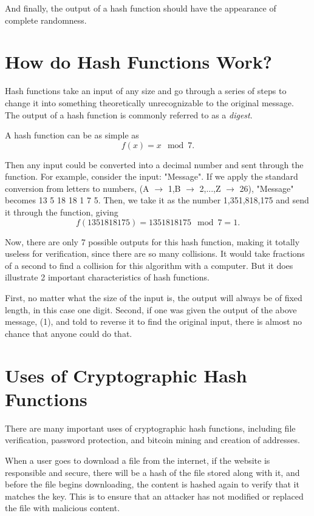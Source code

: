 \documentclass{article}
\begin{document}
And finally, the output of a hash function should have the appearance of complete randomness.

\section{How do Hash Functions Work?}
Hash functions take an input of any size and go through a series of steps to change it into something theoretically unrecognizable to the original message.
The output of a hash function is commonly referred to as a \textit{digest}.

A hash function can be as simple as $$f(x) = x\mod7.$$
		
Then any input could be converted into a decimal number and sent through the function. For example, consider the input: "Message". If we apply the standard conversion from letters to numbers, (A $\rightarrow$ 1,B $\rightarrow$ 2,...,Z $\rightarrow$ 26), "Message" becomes 13 5 18 18 1 7 5. Then, we take it as the number 1,351,818,175 and send it through the function, giving $$f(1351818175) = 1351818175 \mod 7 = 1.$$

Now, there are only 7 possible outputs for this hash function, making it totally useless for verification, since there are so many collisions. It would take fractions of a second to find a collision for this algorithm with a computer. But it does illustrate 2 important characteristics of hash functions. 

First, no matter what the size of the input is, the output will always be of fixed length, in this case one digit. Second, if one was given the output of the above message, (1), and told to reverse it to find the original input, there is almost no chance that anyone could do that.

\section{Uses of Cryptographic Hash Functions}
\tab There are many important uses of cryptographic hash functions, including file verification, password protection, and bitcoin mining and creation of addresses.

When a user goes to download a file from the internet, if the website is responsible and secure, there will be a hash of the file stored along with it, and before the file begins downloading, the content is hashed again to verify that it matches the key. This is to ensure that an attacker has not modified or replaced the file with malicious content.
\end{document}

